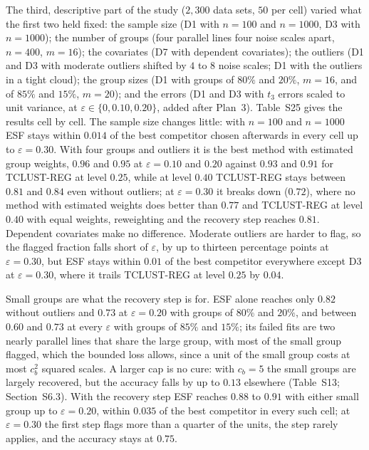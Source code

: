 The third, descriptive part of the study ($2{,}300$ data sets, $50$ per cell) varied what the
first two held fixed: the sample size (D1 with $n=100$ and $n=1000$, D3 with $n=1000$); the
number of groups (four parallel lines four noise scales apart, $n=400$, $m=16$); the covariates
(D7 with dependent covariates); the outliers (D1 and D3 with moderate outliers shifted by $4$ to
$8$ noise scales; D1 with the outliers in a tight cloud); the group sizes (D1 with groups of
$80\%$ and $20\%$, $m=16$, and of $85\%$ and $15\%$, $m=20$); and the errors (D1 and D3 with
$t_3$ errors scaled to unit variance, at $\varepsilon\in\{0,0.10,0.20\}$, added after Plan~3).
Table~S25 gives the results cell by cell. The sample size changes little: with
$n=100$ and $n=1000$ ESF stays within $0.014$ of the best competitor chosen afterwards in every
cell up to $\varepsilon=0.30$. With four groups and outliers it is the best method with estimated group weights, $0.96$ and
$0.95$ at $\varepsilon=0.10$ and $0.20$ against $0.93$ and $0.91$ for TCLUST-REG at level
$0.25$, while at level $0.40$ TCLUST-REG stays between $0.81$ and $0.84$ even without outliers;
at $\varepsilon=0.30$ it breaks down ($0.72$), where no method with estimated weights does better
than $0.77$ and TCLUST-REG at level $0.40$ with equal weights, reweighting and the recovery
step reaches $0.81$.
Dependent covariates make no difference. Moderate outliers are harder to flag, so the flagged
fraction falls short of $\varepsilon$, by up to thirteen percentage points at
$\varepsilon=0.30$, but ESF stays within $0.01$ of the best competitor everywhere except D3 at
$\varepsilon=0.30$, where it trails TCLUST-REG at level $0.25$ by $0.04$.

Small groups are what the recovery step is for. ESF alone reaches only $0.82$ without outliers
and $0.73$ at $\varepsilon=0.20$ with groups of $80\%$ and $20\%$, and between $0.60$ and $0.73$
at every $\varepsilon$ with groups of $85\%$ and $15\%$; its failed fits are two nearly parallel
lines that share the large group, with most of the small group flagged, which the bounded loss
allows, since a unit of the small group costs at most $c_b^{2}$ squared scales. A larger cap is
no cure: with $c_b=5$ the small groups are largely recovered, but the accuracy falls by up to
$0.13$ elsewhere (Table~S13; Section~S6.3). With the recovery step
ESF reaches $0.88$ to $0.91$ with either small group up to $\varepsilon=0.20$, within $0.035$
of the best competitor in every such cell; at $\varepsilon=0.30$ the first step flags more
than a quarter of the units, the step rarely applies, and the accuracy stays at $0.75$.

